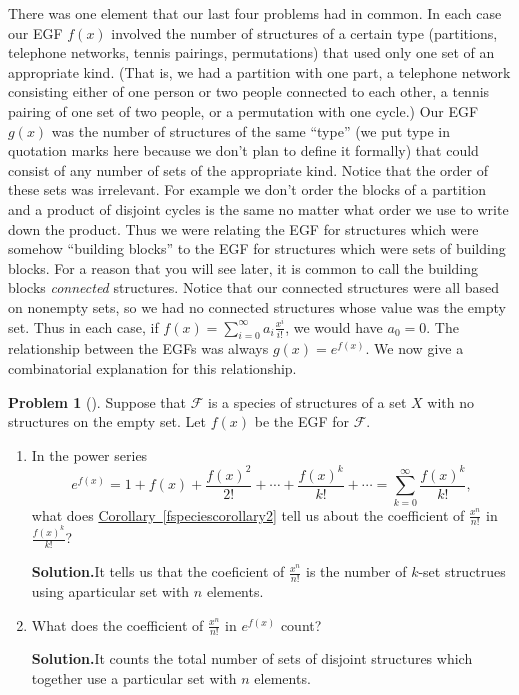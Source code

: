 \documentclass[10pt,]{book}
\theoremstyle{plain}
\theoremstyle{definition}
\newtheorem{activity}[project]{Problem}
\theoremstyle{definition}
\numberwithin{equation}{chapter}
\newcommand{\F}{\mathcal{F}}
\begin{document}
There was one element that our last four problems had in common. In each case our EGF \(f(x)\) involved the number of structures of a certain type (partitions, telephone networks, tennis pairings, permutations) that used only one set of an appropriate kind. (That is, we had a partition with one part, a telephone network consisting either of one person or two people connected to each other, a tennis pairing of one set of two people, or a permutation with one cycle.) Our EGF \(g(x)\) was the number of structures of the same ``type'' (we put type in quotation marks here because we don't plan to define it formally) that could consist of any number of sets of the appropriate kind. Notice that the order of these sets was irrelevant. For example we don't order the blocks of a partition and a product of disjoint cycles is the same no matter what order we use to write down the product. Thus we were relating the EGF for structures which were somehow ``building blocks'' to the EGF for structures which were sets of building blocks. For a reason that you will see later, it is common to call the building blocks \emph{connected} structures. Notice that our connected structures were all based on nonempty sets, so we had no connected structures whose value was the empty set. Thus in each case, if \(f(x) = \sum_{i=0}^\infty a_i\frac{x^i}{i!}\), we would have \(a_0=0\). The relationship between the EGFs was always \(g(x) = e^{f(x)}\). We now give a combinatorial explanation for this relationship.%
\begin{activity}[]\label{exponentialformula}
Suppose that \(\F\) is a species of structures of a set \(X\) with no structures on the empty set.  Let \(f(x)\) be the EGF for \(\F\).%
\begin{enumerate}[font=\bfseries,label=(\alph*),ref=\alph*]
\item\label{task-262} In the power series%
\begin{equation*}
e^{f(x)} = 1 + f(x) + \frac{f(x)^2}{2!} +
\cdots + \frac{f(x)^k}{k!} + \cdots= \sum_{k=0}^\infty \frac{f(x)^k}{k!},
\end{equation*}
what does \hyperref[fspeciescorollary2]{Corollary~\ref{fspeciescorollary2}} tell us about the coefficient of \(\frac{x^n}{n!}\) in \(\frac{f(x)^k}{k!}\)?%
\par\medskip\noindent%
\textbf{Solution.}\quad It tells us that the coeficient of \(\frac{x^n}{n!}\) is the number of \(k\)-set structrues using aparticular set with \(n\) elements.%
\item\label{task-263} What does the coefficient of \(\frac{x^n}{n!}\) in \(e^{f(x)}\) count?%
\par\medskip\noindent%
\textbf{Solution.}\quad It counts the total number of sets of disjoint structures which together use a particular set with \(n\) elements.%
\end{enumerate}
\end{activity}
\end{document}
